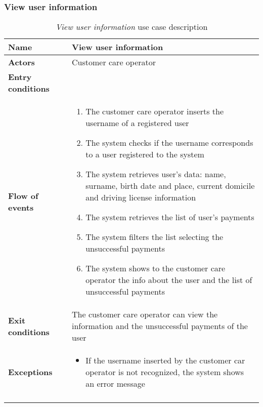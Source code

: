\subsubsection{View user information}
\begin{longtable}{p{0.25\linewidth}p{0.75\linewidth}}
\toprule
\textbf{Name} & \textbf{View user information} \\
\midrule
\textbf{Actors} &  Customer care operator\\
\midrule
\textbf{Entry conditions} & \\
\midrule
\textbf{Flow of events} & 
\begin{enumerate}
	\item The customer care operator inserts the username of a registered user
	\item The system checks if the username corresponds to a user registered to the system
	\item The system retrieves user's data: name, surname, birth date and place, current domicile
	and driving license information 
	\item The system retrieves the list of user's payments
	\item The system filters the list selecting the unsuccessful payments
	\item The system shows to the customer care operator the info about the user and the list of unsuccessful payments
\end{enumerate} \\
\midrule
\textbf{Exit conditions} & The customer care operator can view the information and the unsuccessful payments of the user \\
\midrule
\textbf{Exceptions} & 
\begin{itemize}
	\item If the username inserted by the customer car operator is not recognized, the system shows an error message
\end{itemize} \\
\bottomrule
\caption{\emph{View user information} use case description}
\end{longtable}

\clearpage
